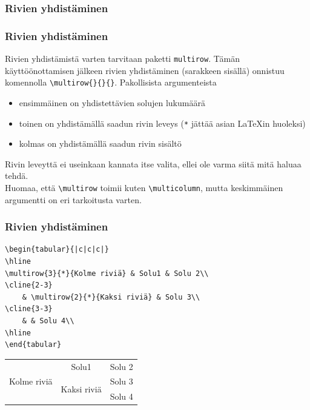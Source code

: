 \documentclass[handout]{beamer}
\theoremstyle{remark}
\newcommand{\vaihto}{\\ \vspace{10pt}}
\begin{document}
\subsubsection{Rivien yhdistäminen}
\begin{frame}[fragile]
\frametitle{Rivien yhdistäminen}
Rivien yhdistämistä varten tarvitaan paketti \verb-multirow-. Tämän käyttöönottamisen jälkeen rivien yhdistäminen (sarakkeen sisällä) onnistuu komennolla \verb-\multirow{}{}{}-. Pakollisista argumenteista
\begin{itemize}
\item ensimmäinen on yhdistettävien solujen lukumäärä
\item toinen on yhdistämällä saadun rivin leveys (\verb-*- jättää asian \LaTeX in huoleksi)
\item kolmas on yhdistämällä saadun rivin sisältö
\end{itemize}
Rivin leveyttä ei useinkaan kannata itse valita, ellei ole varma siitä mitä haluaa tehdä. 
\vaihto
Huomaa, että \verb-\multirow- toimii kuten \verb-\multicolumn-, mutta keskimmäinen argumentti on eri tarkoitusta varten.
\end{frame}
\begin{frame}[fragile]
\frametitle{Rivien yhdistäminen} 
\begin{scriptsize}
\begin{Verbatim}[frame=single]
\begin{tabular}{|c|c|c|}
\hline
\multirow{3}{*}{Kolme riviä} & Solu1 & Solu 2\\
\cline{2-3}
	& \multirow{2}{*}{Kaksi riviä} & Solu 3\\
\cline{3-3}
	& & Solu 4\\
\hline
\end{tabular}
\end{Verbatim}
\end{scriptsize}
\begin{tabular}{|c|c|c|}
\hline
\multirow{3}{*}{Kolme riviä} & Solu1	& Solu 2\\\cline{2-3}
	& \multirow{2}{*}{Kaksi riviä}	& Solu 3\\\cline{3-3}
	& & Solu 4\\
	\hline
\end{tabular}
\end{frame}
\end{document}
